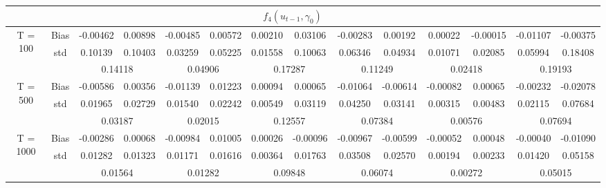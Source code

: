 \documentclass[a4paper,12pt,times,numbered,print,index]{report}
\numberwithin{equation}{section}
\begin{document}
\begin{table}[htbp]
\begin{adjustbox}{max width=\textwidth}
\begin{tabular}{cccccccccccccc}
				\midrule
				&       & \multicolumn{10}{c}{$f_4 (u_{t-1}, \gamma_0)$}                \\
				\midrule
				\multirow{3}[1]{*}{T = 100} & Bias  & -0.00462 & 0.00898 & -0.00485 & 0.00572 & 0.00210 & 0.03106 & -0.00283 & 0.00192 & 0.00022 & -0.00015 & -0.01107 & -0.00375 \\
				& std   & 0.10139 & 0.10403 & 0.03259 & 0.05225 & 0.01558 & 0.10063 & 0.06346 & 0.04934 & 0.01071 & 0.02085 & 0.05994 & 0.18408 \\
				&       & \multicolumn{2}{c}{0.14118} & \multicolumn{2}{c}{0.04906} & \multicolumn{2}{c}{0.17287} & \multicolumn{2}{c}{0.11249} & \multicolumn{2}{c}{0.02418} & \multicolumn{2}{c}{0.19193} \\
				\multirow{3}[0]{*}{T = 500} & Bias  & -0.00586 & 0.00356 & -0.01139 & 0.01223 & 0.00094 & 0.00065 & -0.01064 & -0.00614 & -0.00082 & 0.00065 & -0.00232 & -0.02078 \\
				& std   & 0.01965 & 0.02729 & 0.01540 & 0.02242 & 0.00549 & 0.03119 & 0.04250 & 0.03141 & 0.00315 & 0.00483 & 0.02115 & 0.07684 \\
				&       & \multicolumn{2}{c}{0.03187} & \multicolumn{2}{c}{0.02015} & \multicolumn{2}{c}{0.12557} & \multicolumn{2}{c}{0.07384} & \multicolumn{2}{c}{0.00576} & \multicolumn{2}{c}{0.07694} \\
				\multirow{3}[1]{*}{T = 1000} & Bias  & -0.00286 & 0.00068 & -0.00984 & 0.01005 & 0.00026 & -0.00096 & -0.00967 & -0.00599 & -0.00052 & 0.00048 & -0.00040 & -0.01090 \\
				& std   & 0.01282 & 0.01323 & 0.01171 & 0.01616 & 0.00364 & 0.01763 & 0.03508 & 0.02570 & 0.00194 & 0.00233 & 0.01420 & 0.05158 \\
				&       & \multicolumn{2}{c}{0.01564} & \multicolumn{2}{c}{0.01282} & \multicolumn{2}{c}{0.09848} & \multicolumn{2}{c}{0.06074} & \multicolumn{2}{c}{0.00272} & \multicolumn{2}{c}{0.05015} \\
				\bottomrule
				\bottomrule
			\end{tabular}%
		\end{adjustbox}
		\label{s_f34}%
	\end{table}%
	
\end{document}

